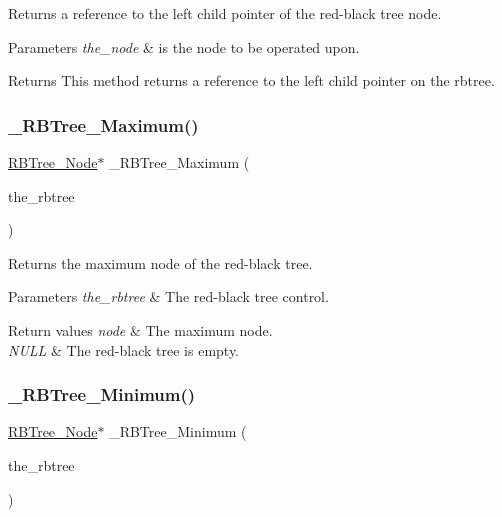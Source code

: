 Returns a reference to the left child pointer of the red-\/black tree node. 


\begin{DoxyParams}{Parameters}
{\em the\+\_\+node} & is the node to be operated upon.\\
\hline
\end{DoxyParams}
\begin{DoxyReturn}{Returns}
This method returns a reference to the left child pointer on the rbtree. 
\end{DoxyReturn}
\mbox{\label{group__RTEMSScoreRBTree_gac5ea3ed76d45cb2b1cfa6f6290f90b65}} 
\subsubsection{\texorpdfstring{\_RBTree\_Maximum()}{\_RBTree\_Maximum()}}
{\footnotesize\ttfamily \mbox{\hyperlink{structRBTree__Node}{R\+B\+Tree\+\_\+\+Node}}$\ast$ \+\_\+\+R\+B\+Tree\+\_\+\+Maximum (\begin{DoxyParamCaption}\item[{const R\+B\+Tree\+\_\+\+Control $\ast$}]{the\+\_\+rbtree }\end{DoxyParamCaption})}



Returns the maximum node of the red-\/black tree. 


\begin{DoxyParams}{Parameters}
{\em the\+\_\+rbtree} & The red-\/black tree control.\\
\hline
\end{DoxyParams}

\begin{DoxyRetVals}{Return values}
{\em node} & The maximum node. \\
\hline
{\em N\+U\+LL} & The red-\/black tree is empty. \\
\hline
\end{DoxyRetVals}
\mbox{\label{group__RTEMSScoreRBTree_ga4b74812f06506bb6f19b910bfb011070}} 
\subsubsection{\texorpdfstring{\_RBTree\_Minimum()}{\_RBTree\_Minimum()}}
{\footnotesize\ttfamily \mbox{\hyperlink{structRBTree__Node}{R\+B\+Tree\+\_\+\+Node}}$\ast$ \+\_\+\+R\+B\+Tree\+\_\+\+Minimum (\begin{DoxyParamCaption}\item[{const R\+B\+Tree\+\_\+\+Control $\ast$}]{the\+\_\+rbtree }\end{DoxyParamCaption})}




